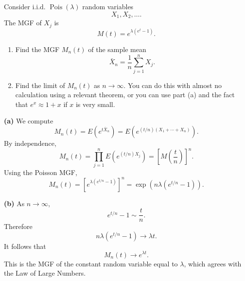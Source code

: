 \documentclass[11pt]{article}
\begin{document}
Consider i.i.d. $\operatorname{Pois}(\lambda)$ random variables
\[
X_1,X_2,\dots.
\]
The MGF of $X_j$ is
\[
M(t)=e^{\lambda(e^t-1)}.
\]

\begin{enumerate}[label=(\alph*), leftmargin=*]
    \item Find the MGF $M_n(t)$ of the sample mean
    \[
    \bar X_n=\frac1n\sum_{j=1}^{n}X_j.
    \]

    \item Find the limit of $M_n(t)$ as $n\to\infty$. You can do this with almost no calculation using a relevant theorem, or you can use part (a) and the fact that $e^x\approx 1+x$ if $x$ is very small.
\end{enumerate}

\begin{solutionbox}
\textbf{(a)} We compute
\[
M_n(t)=E\left(e^{t\bar X_n}\right)
=E\left(e^{(t/n)(X_1+\cdots+X_n)}\right).
\]
By independence,
\[
M_n(t)=\prod_{j=1}^n E\left(e^{(t/n)X_j}\right)
=\left[M\left(\frac tn\right)\right]^n.
\]
Using the Poisson MGF,
\[
M_n(t)=\left[e^{\lambda(e^{t/n}-1)}\right]^n
=
\exp\left(n\lambda(e^{t/n}-1)\right).
\]
 

\textbf{(b)} As $n\to\infty$,
\[
e^{t/n}-1\sim \frac tn.
\]
Therefore
\[
n\lambda(e^{t/n}-1)\to \lambda t.
\]
It follows that
\[
M_n(t)\to e^{\lambda t}.
\]
This is the MGF of the constant random variable equal to $\lambda$, which agrees with the Law of Large Numbers.
 
\end{solutionbox}
\end{document}
